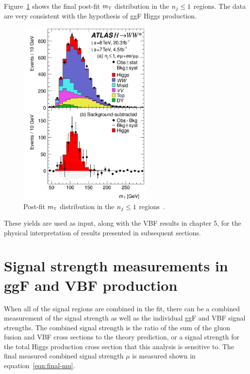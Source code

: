 Figure~\ref{fig:ggF-mT} shows the final post-fit $m_{\textrm{\footnotesize\sc t}}$ distribution in the $n_j \leq 1$ regions. The data are very consistent with the hypothesis of ggF Higgs production. 
%
\begin{figure}[h!]
  \centering
  \captionsetup{justification=centering}

  \includegraphics[width=0.6\textwidth]{figures/ggF_mT}
  \caption{Post-fit $m_{\textrm{\footnotesize\sc t}}$ distribution in the $n_j \leq 1$ regions~\cite{WW2015}.}
  \label{fig:ggF-mT}
\end{figure}
%
These yields are used as input, along with the VBF results in chapter 5, for the physical interpretation of results presented in subsequent sections. 

\section{Signal strength measurements in ggF and VBF production}

When all of the signal regions are combined in the fit, there can be a combined measurement of the signal strength as well as the individual ggF and VBF signal strengths. The combined signal strength is the ratio of the sum of the gluon fusion and VBF cross sections to the theory prediction, or a signal strength for the total Higgs production cross section that this analysis is sensitive to. The final measured combined signal strength $\mu$ is measured shown in equation~\ref{eqn:final-mu}.

